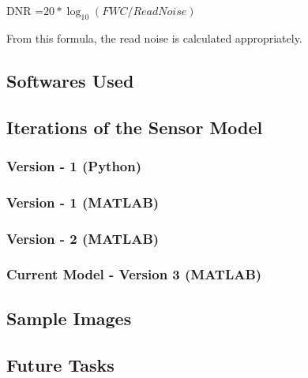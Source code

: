 \documentclass[../../main.tex]{subfiles}
\begin{document}
DNR =$ 20 * \log_{10}{(FWC / Read Noise)}$

From this formula, the read noise is calculated appropriately.








\subsection{Softwares Used}




\subsection{Iterations of the Sensor Model}
\blindtext

\subsubsection{Version - 1 (Python)}
\blindtext

\subsubsection{Version - 1 (MATLAB)}
\blindtext

\subsubsection{Version - 2 (MATLAB)}
\blindtext

\subsubsection{Current Model - Version 3 (MATLAB)}
\blindtext









\subsection{Sample Images}
\blindtext



\subsection{Future Tasks}
\blindtext

\printbibliography
\end{document}
